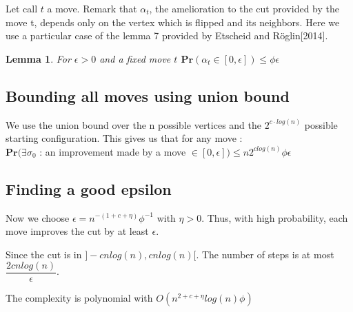 \documentclass[12pt]{article}
\newtheorem{lemma}[theorem]{Lemma}
\begin{document}
Let call $t$ a move. Remark that $\alpha_t$, the amelioration to the cut provided by the move t, depends only on the vertex which is flipped and its neighbors. 
Here we use a particular case of the lemma 7 provided by Etscheid and Röglin[2014]. \\ 
\begin{lemma}
For $\epsilon > 0$ and a fixed move $t$ $\mathbf{Pr}(\alpha_t \in [0,\epsilon]) \leq \phi \epsilon$ \\
\end{lemma}

\subsection{Bounding all moves using union bound}

We use the union bound over the n possible vertices and the $2^{c \cdot log(n)}$ possible starting configuration. This gives us that for any move : \\
 $\mathbf{Pr}(\exists \sigma_0$ : an improvement made by a move $\in [0,\epsilon]) \leq n2^{clog(n)}\phi \epsilon$ \\
 
 \subsection{Finding a good epsilon}
 Now we choose $\epsilon = {n^{-(1 + c + \eta)} \phi^{-1}}$ with $\eta > 0 $. Thus, with high probability, each move improves the cut by at least $\epsilon$. 
 
 Since the cut is in $]-cnlog(n), cnlog(n)[$. The number of steps is at most $\dfrac{2cnlog(n)}{\epsilon}$. 

The complexity is polynomial with $O(n^{2 + c + \eta}log(n)\phi)$\\
\end{document}
